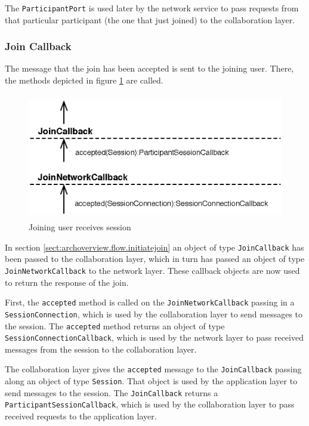 The \texttt{Participant\-Port} is used later by the network service to
pass requests from that particular participant (the one that just joined)
to the collaboration layer.

\subsubsection{Join Callback}
\label{sect:archoverview.flow.joinresponse}
The message that the join has been accepted is sent to the joining user. There,
the methods depicted in figure \ref{fig:archoverview.flow.joinresponse}
are called.

\begin{figure}[H]
 \centering
 \includegraphics[width=12.03cm,height=5.50cm]{../images/finalreport/architecture_flows/join_response.eps}
 \caption{Joining user receives session}
 \label{fig:archoverview.flow.joinresponse}
\end{figure}

In section \ref{sect:archoverview.flow.initiatejoin} an object of type
\texttt{Join\-Callback} has been passed to the collaboration layer, which in
turn has passed an object of type \texttt{Join\-Network\-Callback} to the
network layer. These callback objects are now used to return the response
of the join.

First, the \texttt{accepted} method is called on the 
\texttt{Join\-Network\-Callback} passing in a \texttt{Session\-Connection},
which is used by the collaboration layer to send messages 
to the session. The \texttt{accepted} method returns an object of type
\texttt{Session\-Connection\-Callback}, which is used by the network layer to
pass received messages from the session to the collaboration layer.

The collaboration layer gives the \texttt{accepted} message to the
\texttt{Join\-Callback} passing along an object of type \texttt{Session}. That
object is used by the application layer to send messages to the session. The
\texttt{Join\-Callback} returns a \texttt{Participant\-Session\-Callback}, which
is used by the collaboration layer to pass received requests to the 
application layer.


